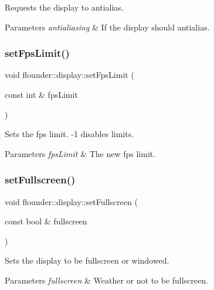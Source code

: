 Requests the display to antialias. 


\begin{DoxyParams}{Parameters}
{\em antialiasing} & If the display should antialias. \\
\hline
\end{DoxyParams}
\mbox{\label{classflounder_1_1display_a7d24403c951e5a043675c3e7b02c3c34}} 
\subsubsection{\texorpdfstring{set\+Fps\+Limit()}{setFpsLimit()}}
{\footnotesize\ttfamily void flounder\+::display\+::set\+Fps\+Limit (\begin{DoxyParamCaption}\item[{const int \&}]{fps\+Limit }\end{DoxyParamCaption})}



Sets the fps limit. -\/1 disables limits. 


\begin{DoxyParams}{Parameters}
{\em fps\+Limit} & The new fps limit. \\
\hline
\end{DoxyParams}
\mbox{\label{classflounder_1_1display_ae5ee27f982e6a947305dc6e71a23021b}} 
\subsubsection{\texorpdfstring{set\+Fullscreen()}{setFullscreen()}}
{\footnotesize\ttfamily void flounder\+::display\+::set\+Fullscreen (\begin{DoxyParamCaption}\item[{const bool \&}]{fullscreen }\end{DoxyParamCaption})}



Sets the display to be fullscreen or windowed. 


\begin{DoxyParams}{Parameters}
{\em fullscreen} & Weather or not to be fullscreen. \\
\hline
\end{DoxyParams}
\mbox{\label{classflounder_1_1display_a49ba8d850f666496fabf9133d01091ab}} 
